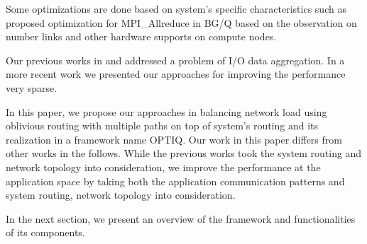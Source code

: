 Some optimizations are done based on system’s specific characteristics such as \cite{Kumar:Allreduce} proposed optimization for MPI\_Allreduce in BG/Q based on the observation on number links and other hardware supports on compute nodes.

Our previous works in \cite{Vishwanath:GLEAN} and \cite{SDAV:Bui2014b} addressed a problem of I/O data aggregation. In a more recent work \cite{hbui:bgq} we presented our approaches for improving the performance very sparse. 

In this paper, we propose our approaches in balancing network load using oblivious routing with multiple paths on top of system's routing and its realization in a framework name OPTIQ. Our work in this paper differs from other works in the follows. While the previous works took the system routing and network topology into consideration, we improve the performance at the application space by taking both the application communication patterns and system routing, network topology into consideration. 

In the next section, we present an overview of the framework and functionalities of its components.
